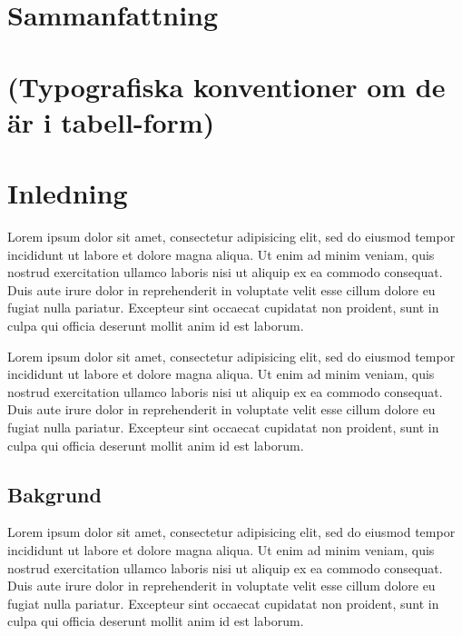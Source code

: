 \documentclass[a4paper,12pt,oneside,final]{extbook}
\begin{document}
	

\pagestyle{fancy}

\chapter{Sammanfattning}

\tableofcontents

\cleardoublepage
{}
\listoffigures

\cleardoublepage
{}
\listoftables

\chapter{(Typografiska konventioner om de är i tabell-form)}

\mainmatter

\chapter{Inledning}

Lorem ipsum dolor sit amet, consectetur adipisicing elit, sed do eiusmod tempor incididunt ut labore et dolore magna aliqua. Ut enim ad minim veniam, quis nostrud exercitation ullamco laboris nisi ut aliquip ex ea commodo consequat. Duis aute irure dolor in reprehenderit in voluptate velit esse cillum dolore eu fugiat nulla pariatur. Excepteur sint occaecat cupidatat non proident, sunt in culpa qui officia deserunt mollit anim id est laborum.

Lorem ipsum dolor sit amet, consectetur adipisicing elit, sed do eiusmod tempor incididunt ut labore et dolore magna aliqua. Ut enim ad minim veniam, quis nostrud exercitation ullamco laboris nisi ut aliquip ex ea commodo consequat. Duis aute irure dolor in reprehenderit in voluptate velit esse cillum dolore eu fugiat nulla pariatur. Excepteur sint occaecat cupidatat non proident, sunt in culpa qui officia deserunt mollit anim id est laborum.

\section{Bakgrund}

Lorem ipsum dolor sit amet, consectetur adipisicing elit, sed do eiusmod tempor incididunt ut labore et dolore magna aliqua. Ut enim ad minim veniam, quis nostrud exercitation ullamco laboris nisi ut aliquip ex ea commodo consequat. Duis aute irure dolor in reprehenderit in voluptate velit esse cillum dolore eu fugiat nulla pariatur. Excepteur sint occaecat cupidatat non proident, sunt in culpa qui officia deserunt mollit anim id est laborum.
\end{document}
